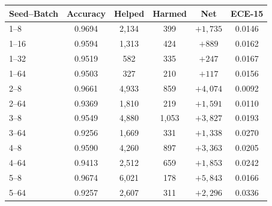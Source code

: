 \footnotesize
\setlength{\tabcolsep}{2.5pt}
\begin{tabular}{lccccc}
\toprule
Seed--Batch & Accuracy & Helped & Harmed & Net & ECE-15 \\
\midrule
1--8 & 0.9694 & 2{,}134 & 399 & $+1{,}735$ & 0.0146 \\
1--16 & 0.9594 & 1{,}313 & 424 & $+889$ & 0.0162 \\
1--32 & 0.9519 & 582 & 335 & $+247$ & 0.0167 \\
1--64 & 0.9503 & 327 & 210 & $+117$ & 0.0156 \\
2--8 & 0.9661 & 4{,}933 & 859 & $+4{,}074$ & 0.0092 \\
2--64 & 0.9369 & 1{,}810 & 219 & $+1{,}591$ & 0.0110 \\
3--8 & 0.9549 & 4{,}880 & 1{,}053 & $+3{,}827$ & 0.0193 \\
3--64 & 0.9256 & 1{,}669 & 331 & $+1{,}338$ & 0.0270 \\
4--8 & 0.9590 & 4{,}260 & 897 & $+3{,}363$ & 0.0205 \\
4--64 & 0.9413 & 2{,}512 & 659 & $+1{,}853$ & 0.0242 \\
5--8 & 0.9674 & 6{,}021 & 178 & $+5{,}843$ & 0.0166 \\
5--64 & 0.9257 & 2{,}607 & 311 & $+2{,}296$ & 0.0336 \\
\bottomrule
\end{tabular}
